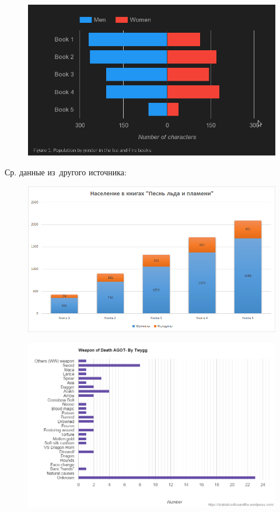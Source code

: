\documentclass{beamer}
\begin{document}
\begin{frame}
\begin{figure}
\includegraphics[width=0.9\linewidth]{IandF_gender}
\end{figure}
\cite{p1}
\end{frame}

\begin{frame}
Ср. данные из~другого источника:
\begin{figure}
\includegraphics[width=0.8\linewidth]{IandF_gender2}
\end{figure}
\cite{p9}
\end{frame}

\begin{frame}
\begin{figure}
\includegraphics[width=0.9\linewidth]{weaponofdeath}
\end{figure}
\cite{p8}
\end{frame}
\end{document}
